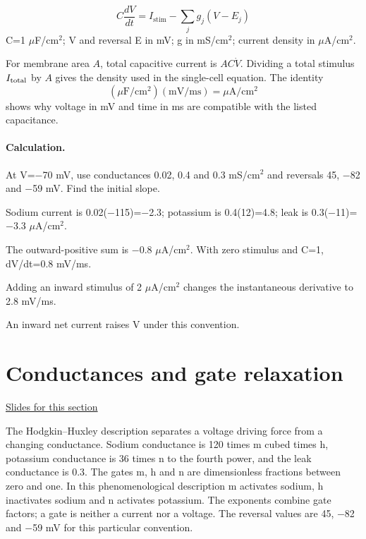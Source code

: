 \documentclass[11pt,letterpaper]{article}
\theoremstyle{definition}\newtheorem{definition}{Definition}\newtheorem{example}{Example}
\numberwithin{equation}{section}
\begin{document}
\[
C\frac{dV}{dt}=I_{\mathrm{stim}}-\sum_j g_j(V-E_j)
\]
C=1 \ensuremath{\mu}F/cm\ensuremath{^{2}}; V and reversal E in mV; g in mS/cm\ensuremath{^{2}}; current density in \ensuremath{\mu}A/cm\ensuremath{^{2}}.

For membrane area $A$, total capacitive current is $AC\dot V$. Dividing a total stimulus $I_{\rm total}$ by $A$ gives the density used in the single-cell equation. The identity
\[
 (\mu\mathrm F/\mathrm{cm}^2)(\mathrm{mV}/\mathrm{ms})
  =\mu\mathrm A/\mathrm{cm}^2
\]
shows why voltage in mV and time in ms are compatible with the listed capacitance.

\paragraph{Calculation.} At V=\ensuremath{-}70 mV, use conductances 0.02, 0.4 and 0.3 mS/cm\ensuremath{^{2}} and reversals 45, \ensuremath{-}82 and \ensuremath{-}59 mV. Find the initial slope.

Sodium current is 0.02(\ensuremath{-}115)=\ensuremath{-}2.3; potassium is 0.4(12)=4.8; leak is 0.3(\ensuremath{-}11)=\ensuremath{-}3.3 \ensuremath{\mu}A/cm\ensuremath{^{2}}.

The outward-positive sum is \ensuremath{-}0.8 \ensuremath{\mu}A/cm\ensuremath{^{2}}. With zero stimulus and C=1, dV/dt=0.8 mV/ms.

Adding an inward stimulus of 2 \ensuremath{\mu}A/cm\ensuremath{^{2}} changes the instantaneous derivative to 2.8 mV/ms.

An inward net current raises V under this convention.
\section{Conductances and gate relaxation}
\hypertarget{note-conductances-and-gate-relaxation}{}\label{note:conductances-and-gate-relaxation}
{\small \href{slides.html\#frame=voltage-driving-forces-and-conductances-panel-1\&step=1}{Slides for this section}}\par
The Hodgkin--Huxley description separates a voltage driving force from a changing conductance. Sodium conductance is 120 times m cubed times h, potassium conductance is 36 times n to the fourth power, and the leak conductance is 0.3. The gates m, h and n are dimensionless fractions between zero and one. In this phenomenological description m activates sodium, h inactivates sodium and n activates potassium. The exponents combine gate factors; a gate is neither a current nor a voltage. The reversal values are 45, \ensuremath{-}82 and \ensuremath{-}59 mV for this particular convention.
\end{document}
